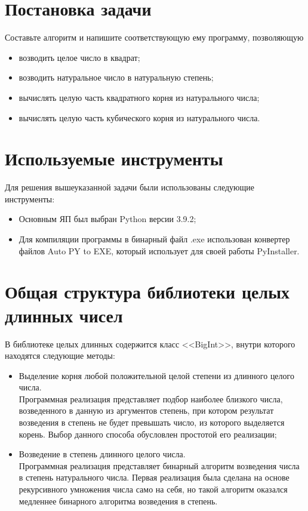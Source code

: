 \section{Постановка задачи}
Составьте алгоритм и напишите соответствующую ему программу, позволяющую
\begin{itemize}
    \item возводить целое число в квадрат;
    \item возводить натуральное число в натуральную степень;
    \item вычислять целую часть квадратного корня из натурального числа;
    \item вычислять целую часть кубического корня из натурального числа.
\end{itemize}


\clearpage
\section{Используемые инструменты}
Для решения вышеуказанной задачи были использованы следующие инструменты:
\begin{itemize}
    \item Основным ЯП был выбран Python версии 3.9.2;
    \item Для компиляции программы в бинарный файл .exe использован конвертер файлов Auto PY to EXE,
    который использует для своей работы PyInstaller.
\end{itemize}


\clearpage
\section{Общая структура библиотеки целых\\длинных чисел}
В библиотеке целых длинных содержится класс <<BigInt>>, внутри которого находятся следующие методы:
\begin{itemize}
    \item Выделение корня любой положительной целой степени из длинного целого числа.\\
    Программная реализация представляет подбор наиболее близкого числа, возведенного в данную из аргументов степень,
    при котором результат возведения в степень не будет превышать число, из которого выделяется корень.
    Выбор данного способа обусловлен простотой его реализации;
    \item Возведение в степень длинного целого числа.\\
    Программная реализация представляет бинарный алгоритм возведения числа в степень натурального числа.
    Первая реализация была сделана на основе рекурсивного умножения числа само на себя,
    но такой алгоритм оказался медленнее бинарного алгоритма возведения в степень.
\end{itemize}


